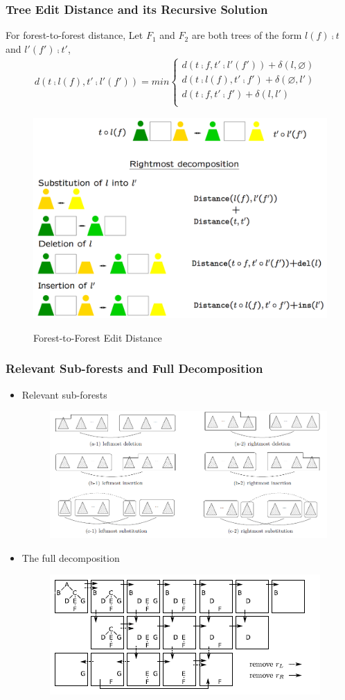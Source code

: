 \documentclass{beamer}
\begin{document}
\begin{frame}
\frametitle{Tree Edit Distance and its Recursive Solution}
For forest-to-forest distance,
Let $F_1$ and $F_2$ are both trees of the form $l(f) \comp t$ and $l'(f') \comp t'$, 
\begin{align*}
d(t \comp l(f), t' \comp l'(f')) = min \begin{cases}
	  	d(t  \comp f, t' \comp l'(f')) + \delta(l, \varnothing) \\ 
      	d(t \comp l(f), t'  \comp f') + \delta(\varnothing, l') \\ 
    	d(t \comp f, t' \comp f') + \delta(l, l') & \\
    \end{cases}
\end{align*}
\begin{figure}
	\includegraphics[width=0.55\linewidth]{ForestRightmostDecomposition}
	\label{Forest-to-Forest Edit Distance} 
	\caption{Forest-to-Forest Edit Distance}
	\centering
\end{figure}
\end{frame}
\begin{frame}
\frametitle{Relevant Sub-forests and Full Decomposition}
\begin{itemize}
\item  Relevant sub-forests
\begin{figure}
	\includegraphics[width=0.7\linewidth]{LeftRightDecomposition}
	\centering
\end{figure}
\item The full decomposition
\begin{figure}
	\includegraphics[width=0.6\linewidth]{FullDecomposition}
	\centering
\end{figure}
\end{itemize}
\end{frame}
\end{document}
